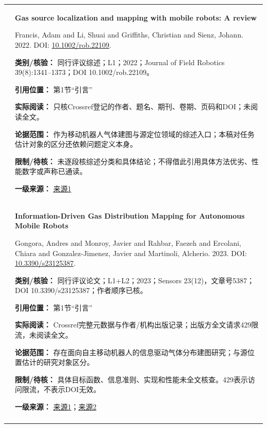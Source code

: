 \begin{longtable}{@{}>{\raggedright\arraybackslash}p{0.7cm}>{\raggedright\arraybackslash}p{14.8cm}@{}}
1 & \textbf{Gas source localization and mapping with mobile robots: A review}\par Francis, Adam and Li, Shuai and Griffiths, Christian and Sienz, Johann. 2022. DOI: \url{10.1002/rob.22109}. \par\textbf{类别/核验：} 同行评议综述；L1；2022；Journal of Field Robotics 39(8):1341–1373；DOI 10.1002/rob.22109。\par\textbf{引用位置：} 第1节“引言”\par\textbf{实际阅读：} 只核Crossref登记的作者、题名、期刊、卷期、页码和DOI；未阅读全文。\par\textbf{论据范围：} 作为移动机器人气体建图与源定位领域的综述入口；本稿对任务估计对象的区分还依赖问题定义本身。\par\textbf{限制/待核：} 未逐段核综述分类和具体结论；不得借此引用具体方法优劣、性能数字或声称已通读。\par\textbf{一级来源：} \href{https://doi.org/10.1002/rob.22109}{来源1} \\\addlinespace[6pt]
2 & \textbf{Information-Driven Gas Distribution Mapping for Autonomous Mobile Robots}\par Gongora, Andres and Monroy, Javier and Rahbar, Faezeh and Ercolani, Chiara and Gonzalez-Jimenez, Javier and Martinoli, Alcherio. 2023. DOI: \url{10.3390/s23125387}. \par\textbf{类别/核验：} 同行评议论文；L1+L2；2023；Sensors 23(12)，文章号5387；DOI 10.3390/s23125387；作者顺序已核。\par\textbf{引用位置：} 第1节“引言”\par\textbf{实际阅读：} Crossref完整元数据与作者/机构出版记录；出版方全文请求429限流，未阅读全文。\par\textbf{论据范围：} 存在面向自主移动机器人的信息驱动气体分布建图研究；与源位置估计的研究对象区分。\par\textbf{限制/待核：} 具体目标函数、信息准则、实现和性能未全文核查。429表示访问限流，不表示DOI无效。\par\textbf{一级来源：} \href{https://www.mdpi.com/1424-8220/23/12/5387}{来源1}；\href{https://www.epfl.ch/labs/disal/research/gassensingstructure/}{来源2} \\\addlinespace[6pt]

\end{longtable}

